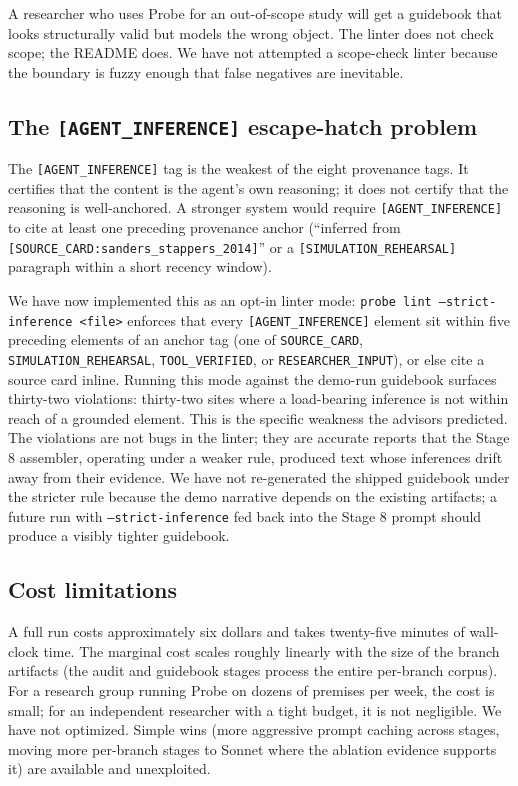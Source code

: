 A researcher who uses Probe for an out-of-scope study will get a guidebook that looks structurally valid but models the wrong object. The linter does not check scope; the README does. We have not attempted a scope-check linter because the boundary is fuzzy enough that false negatives are inevitable.

\subsection{The \texttt{[AGENT\_INFERENCE]} escape-hatch problem}

The \texttt{[AGENT\_INFERENCE]} tag is the weakest of the eight provenance tags. It certifies that the content is the agent's own reasoning; it does not certify that the reasoning is well-anchored. A stronger system would require \texttt{[AGENT\_INFERENCE]} to cite at least one preceding provenance anchor (``inferred from \texttt{[SOURCE\_CARD:sanders\_stappers\_2014]}'' or a \texttt{[SIMULATION\_REHEARSAL]} paragraph within a short recency window).

We have now implemented this as an opt-in linter mode: \texttt{probe lint --strict-inference <file>} enforces that every \texttt{[AGENT\_INFERENCE]} element sit within five preceding elements of an anchor tag (one of \texttt{SOURCE\_CARD}, \texttt{SIMULATION\_REHEARSAL}, \texttt{TOOL\_VERIFIED}, or \texttt{RESEARCHER\_INPUT}), or else cite a source card inline. Running this mode against the demo-run guidebook surfaces thirty-two violations: thirty-two sites where a load-bearing inference is not within reach of a grounded element. This is the specific weakness the advisors predicted. The violations are not bugs in the linter; they are accurate reports that the Stage 8 assembler, operating under a weaker rule, produced text whose inferences drift away from their evidence. We have not re-generated the shipped guidebook under the stricter rule because the demo narrative depends on the existing artifacts; a future run with \texttt{--strict-inference} fed back into the Stage 8 prompt should produce a visibly tighter guidebook.

\subsection{Cost limitations}

A full run costs approximately six dollars and takes twenty-five minutes of wall-clock time. The marginal cost scales roughly linearly with the size of the branch artifacts (the audit and guidebook stages process the entire per-branch corpus). For a research group running Probe on dozens of premises per week, the cost is small; for an independent researcher with a tight budget, it is not negligible. We have not optimized. Simple wins (more aggressive prompt caching across stages, moving more per-branch stages to Sonnet where the ablation evidence supports it) are available and unexploited.
